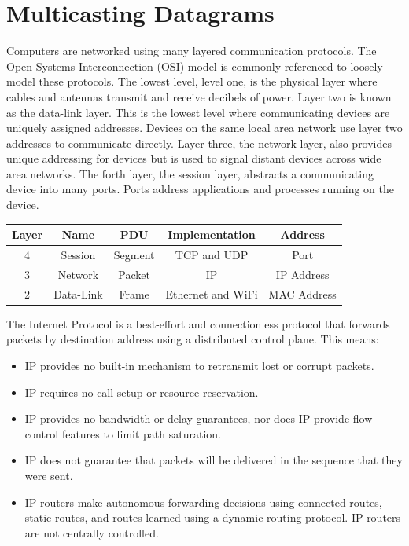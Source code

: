\documentclass{book}
\begin{document}
\chapter{Multicasting Datagrams}

Computers are networked using many layered communication protocols. The Open Systems Interconnection (OSI) model is commonly referenced to loosely model these protocols. The lowest level, level one, is the physical layer where cables and antennas transmit and receive decibels of power. Layer two is known as the data-link layer. This is the lowest level where communicating devices are uniquely assigned addresses. Devices on the same local area network use layer two addresses to communicate directly. Layer three, the network layer, also provides unique addressing for devices but is used to signal distant devices across wide area networks. The forth layer, the session layer, abstracts a communicating device into many ports. Ports address applications and processes running on the device.

\begin{center}
\begin{tabular}{c | c | c | c | c}
Layer & Name & PDU & Implementation & Address \\
\hline
4 & Session & Segment & TCP and UDP & Port \\
3 & Network & Packet & IP & IP Address \\
2 & Data-Link & Frame & Ethernet and WiFi & MAC Address \\
\end{tabular}
\end{center}

The Internet Protocol is a best-effort and connectionless protocol that forwards packets by destination address using a distributed control plane. This means:

\begin{itemize}
\item IP provides no built-in mechanism to retransmit lost or corrupt packets.
\item IP requires no call setup or resource reservation.
\item IP provides no bandwidth or delay guarantees, nor does IP provide flow control features to limit path saturation.
\item IP does not guarantee that packets will be delivered in the sequence that they were sent.
\item IP routers make autonomous forwarding decisions using connected routes, static routes, and routes learned using a dynamic routing protocol. IP routers are not centrally controlled.
\end{itemize}
\end{document}
